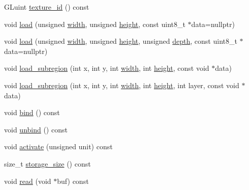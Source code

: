 \begin{DoxyCompactItemize}
\item 
G\+Luint \hyperlink{classpixel_1_1graphics_1_1_texture_aae426a528730f071bd5c7497ac44b0e8}{texture\+\_\+id} () const
\item 
void \hyperlink{classpixel_1_1graphics_1_1_texture_a4c96f1d5e0a5db20aa7fba148d193aef}{load} (unsigned \hyperlink{classpixel_1_1graphics_1_1_texture_ab07e516f1b3fc101c9950b086d2dc98c}{width}, unsigned \hyperlink{classpixel_1_1graphics_1_1_texture_a7f1c5dd40fa624d56ad062a5dbe1d6d2}{height}, const uint8\+\_\+t $\ast$data=nullptr)
\item 
void \hyperlink{classpixel_1_1graphics_1_1_texture_a9209f89c7fb63ffa6f92816c34ba620a}{load} (unsigned \hyperlink{classpixel_1_1graphics_1_1_texture_ab07e516f1b3fc101c9950b086d2dc98c}{width}, unsigned \hyperlink{classpixel_1_1graphics_1_1_texture_a7f1c5dd40fa624d56ad062a5dbe1d6d2}{height}, unsigned \hyperlink{classpixel_1_1graphics_1_1_texture_ae90ae0823981c742f0481eb315f071ab}{depth}, const uint8\+\_\+t $\ast$data=nullptr)
\item 
void \hyperlink{classpixel_1_1graphics_1_1_texture_a94791afa3d372f2d264bff8e0d145ecf}{load\+\_\+subregion} (int x, int y, int \hyperlink{classpixel_1_1graphics_1_1_texture_ab07e516f1b3fc101c9950b086d2dc98c}{width}, int \hyperlink{classpixel_1_1graphics_1_1_texture_a7f1c5dd40fa624d56ad062a5dbe1d6d2}{height}, const void $\ast$data)
\item 
void \hyperlink{classpixel_1_1graphics_1_1_texture_a61aec4095169ac925cd23e9b3efd32de}{load\+\_\+subregion} (int x, int y, int \hyperlink{classpixel_1_1graphics_1_1_texture_ab07e516f1b3fc101c9950b086d2dc98c}{width}, int \hyperlink{classpixel_1_1graphics_1_1_texture_a7f1c5dd40fa624d56ad062a5dbe1d6d2}{height}, int layer, const void $\ast$data)
\item 
void \hyperlink{classpixel_1_1graphics_1_1_texture_a4b85391c6e54686ec566ba38c62dde98}{bind} () const
\item 
void \hyperlink{classpixel_1_1graphics_1_1_texture_a451d7afac3848417bb1007d39ee7d545}{unbind} () const
\item 
void \hyperlink{classpixel_1_1graphics_1_1_texture_aa3d5943d9e4bc11282054fa75f58552c}{activate} (unsigned unit) const
\item 
size\+\_\+t \hyperlink{classpixel_1_1graphics_1_1_texture_a76935e3bb454ff65bfc21bba3d6ce687}{storage\+\_\+size} () const
\item 
void \hyperlink{classpixel_1_1graphics_1_1_texture_ae8511c01f2a46a482befaa003a224236}{read} (void $\ast$buf) const
\end{DoxyCompactItemize}
